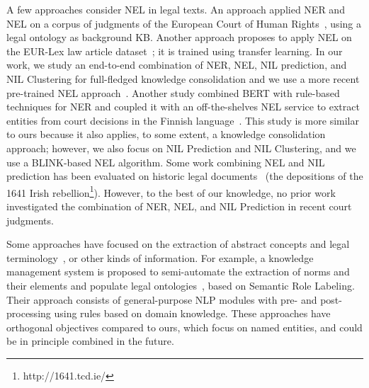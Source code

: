 

A few approaches consider NEL in legal texts. An approach applied NER and NEL on a corpus of judgments of the European Court of Human Rights~\cite{cardellino_etal_2017_lowcost}, using a legal ontology as background KB. Another approach proposes to apply NEL on the EUR-Lex law article dataset~\cite{Elnaggar2018}; it is trained using transfer learning. In our work, we study an end-to-end combination of NER, NEL, NIL prediction, and NIL Clustering for full-fledged knowledge consolidation and we use a more recent pre-trained NEL approach~\cite{blink}. Another study combined BERT with rule-based techniques for NER and coupled it with an off-the-shelves NEL service to extract entities from court decisions in the Finnish language~\cite{Tamper2020}.
This study is more similar to ours because it also applies, to some extent, a knowledge consolidation approach; however, we also focus on NIL Prediction and NIL Clustering, and we use a BLINK-based NEL algorithm.
Some work combining NEL and NIL prediction has been evaluated on historic legal documents~\cite{klie-etal-2020-zero} (the depositions of the 1641 Irish rebellion\footnote{http://1641.tcd.ie/}). However, to the best of our knowledge, no prior work investigated the combination of NER, NEL, and NIL Prediction in recent court judgments.  

Some approaches have focused on the extraction of abstract concepts and legal terminology~\cite{CASTANO2022101842}, or other kinds of information. For example, a knowledge management system is proposed to semi-automate the extraction of norms and their elements and populate legal ontologies~\cite{humphreys2020}, based on Semantic Role Labeling. Their approach consists of general-purpose NLP modules with pre- and post-processing using rules based on domain knowledge. These approaches have orthogonal objectives compared to ours, which focus on named entities, and could be in principle combined in the future. 


